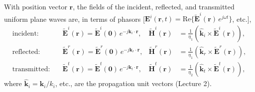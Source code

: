 \documentclass[11pt, oneside]{article}
\begin{document}
With position vector $\mathbf{r}$, the fields of the incident, reflected, and transmitted uniform plane waves are, in terms of phasors [$\mathbf{E}^i(\mathbf{r},t) = \mathrm{Re}\{\tilde{\mathbf{E}}^i(\mathbf{r})\,e^{j\omega t}\}$, etc.],
\begin{align}
	\text{incident:} \quad &
	\tilde{\mathbf{E}}^i(\mathbf{r}) = \tilde{\mathbf{E}}^i(\mathbf{0})\,e^{-j\mathbf{k}_i\cdot\mathbf{r}}, &
	\tilde{\mathbf{H}}^i(\mathbf{r}) &= \frac{1}{\eta_1}\left(\hat{\mathbf{k}}_i\times\tilde{\mathbf{E}}^i(\mathbf{r})\right), \label{e:field_i}\\
	\text{reflected:} \quad &
	\tilde{\mathbf{E}}^r(\mathbf{r}) = \tilde{\mathbf{E}}^r(\mathbf{0})\,e^{-j\mathbf{k}_r\cdot\mathbf{r}}, &
	\tilde{\mathbf{H}}^r(\mathbf{r}) &= \frac{1}{\eta_1}\left(\hat{\mathbf{k}}_r\times\tilde{\mathbf{E}}^r(\mathbf{r})\right), \label{e:field_r}\\
	\text{transmitted:} \quad &
	\tilde{\mathbf{E}}^t(\mathbf{r}) = \tilde{\mathbf{E}}^t(\mathbf{0})\,e^{-j\mathbf{k}_t\cdot\mathbf{r}}, &
	\tilde{\mathbf{H}}^t(\mathbf{r}) &= \frac{1}{\eta_2}\left(\hat{\mathbf{k}}_t\times\tilde{\mathbf{E}}^t(\mathbf{r})\right), \label{e:field_t}
\end{align}
where $\hat{\mathbf{k}}_i = \mathbf{k}_i/k_i$, etc., are the propagation unit vectors (Lecture 2).
\end{document}
